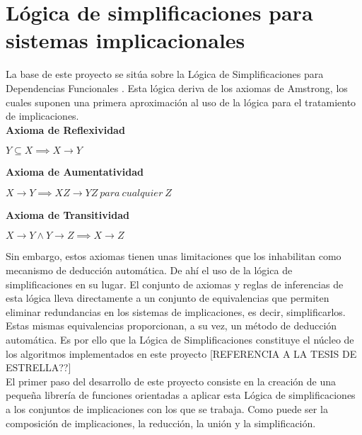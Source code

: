 \section{L\'ogica de simplificaciones para sistemas implicacionales}


La base de este proyecto se sit\'ua sobre la L\'ogica de Simplificaciones para Dependencias Funcionales \cite{Cordero2002}. Esta l\'ogica deriva de los axiomas de Amstrong, los cuales suponen una primera aproximaci\'on al uso de la l\'ogica para el tratamiento de implicaciones.\\

\textbf{Axioma de Reflexividad}

\begin{center}
    \(Y \subseteq X \implies X \to Y \)
\end{center}

\textbf{Axioma de Aumentatividad}

\begin{center}
    \(X \to Y \implies XZ \to YZ \ para \ cualquier \ Z \)
\end{center}

\textbf{Axioma de Transitividad}

\begin{center}
    \(X \to Y \wedge Y \to Z \implies X \to Z \)
\end{center}

Sin embargo, estos axiomas tienen unas limitaciones que los inhabilitan como mecanismo de deducci\'on autom\'atica. De ah\'i el uso de la l\'ogica de simplificaciones en su lugar. El conjunto de axiomas y reglas de inferencias de esta l\'ogica lleva directamente a un conjunto de equivalencias que permiten eliminar redundancias en los sistemas de implicaciones, es decir, simplificarlos. Estas mismas equivalencias proporcionan, a su vez, un m\'etodo de deducci\'on autom\'atica. Es por ello que la L\'ogica de Simplificaciones constituye el n\'ucleo de los algoritmos implementados en este proyecto [REFERENCIA A LA TESIS DE ESTRELLA??]\\




El primer paso del desarrollo de este proyecto consiste en la creaci\'on de una peque\~na librer\'ia de funciones
orientadas a aplicar esta L\'ogica de simplificaciones a los conjuntos de implicaciones con los que se trabaja. Como 
puede ser la composici\'on de implicaciones, la reducci\'on, la uni\'on y la simplificaci\'on.


